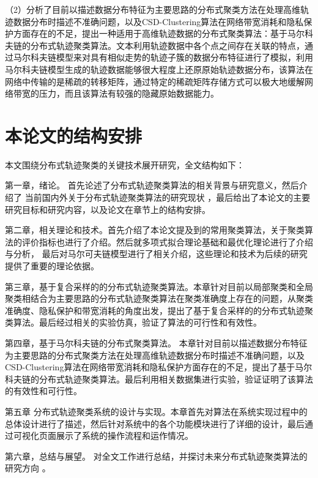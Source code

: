 （2）分析了目前以描述数据分布特征为主要思路的分布式聚类方法在处理高维轨迹数据分布时描述不准确问题，以及CSD-Clustering算法在网络带宽消耗和隐私保护方面存在的不足，提出一种适用于高维轨迹数据的分布式聚类算法：基于马尔科夫链的分布式轨迹聚类算法。文本利用轨迹数据中各个点之间存在关联的特点，通过马尔科夫链模型来对具有相似走势的轨迹子簇的数据分布特征进行了模拟，利用马尔科夫链模型生成的轨迹数据能够很大程度上还原原始轨迹数据分布，该算法在网络中传输的是稀疏的转移矩阵，通过特定的稀疏矩阵存储方式可以极大地缓解网络带宽的压力，而且该算法有较强的隐藏原始数据能力。


\section{本论文的结构安排}
本文围绕分布式轨迹聚类的关键技术展开研究，全文结构如下：

第一章，绪论。 首先论述了分布式轨迹聚类算法的相关背景与研究意义，然后介绍了 当前国内外关于分布式轨迹聚类算法的研究现状 ，最后给出了本论文的主要研究目标和研究内容，以及论文在章节上的结构安排。

第二章，相关理论和技术。首先介绍了本论文提及到的常用聚类算法，关于聚类算法的评价指标也进行了介绍。然后就多项式拟合理论基础和最优化理论进行了介绍与分析， 最后对马尔可夫链模型进行了相关介绍，这些理论和技术为后续的研究提供了重要的理论依据。

第三章，基于复合采样的的分布式轨迹聚类算法。本章针对目前以局部聚类和全局聚类相结合为主要思路的分布式轨迹聚类算法在聚类准确度上存在的问题，从聚类准确度、隐私保护和带宽消耗的角度出发，提出了基于复合采样的的分布式轨迹聚类算法。最后经过相关的实验仿真，验证了算法的可行性和有效性。

第四章，基于马尔科夫链的分布式聚类算法。 本章针对目前以描述数据分布特征为主要思路的分布式聚类方法在处理高维轨迹数据分布时描述不准确问题，以及CSD-Clustering算法在网络带宽消耗和隐私保护方面存在的不足，提出了基于马尔科夫链的分布式轨迹聚类算法。最后利用相关数据集进行实验，验证证明了该算法的有效性和可行性。

第五章 分布式轨迹聚类系统的设计与实现。本章首先对算法在系统实现过程中的总体设计进行了描述，然后针对系统中的各个功能模块进行了详细的设计，最后通过可视化页面展示了系统的操作流程和运作情况。

第六章，总结与展望。 对全文工作进行总结，并探讨未来分布式轨迹聚类算法的研究方向 。